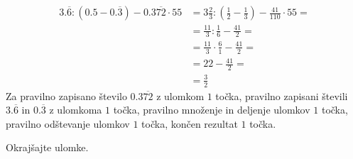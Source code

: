 \documentclass[addpoints,12pt]{exam}
\begin{document}
\begin{questions}
\begin{parts}
        \begin{solution}[4cm]
            \begin{align*}
                3.\overline{6}:(0.5-0.\overline{3})-0.3\overline{72}\cdot 55 &= 3\frac{2}{3}:(\frac{1}{2}-\frac{1}{3})-\frac{41}{110}\cdot 55= \\
                                                                            &= \frac{11}{3}:\frac{1}{6}-\frac{41}{2}= \\
                                                                            &= \frac{11}{3}\cdot \frac{6}{1}-\frac{41}{2}= \\
                                                                            &= 22-\frac{41}{2}= \\
                                                                            &= \frac{3}{2}
            \end{align*}
            Za pravilno zapisano število $0.3\overline{72}$ z ulomkom $1$ točka, pravilno zapisani števili $3.\overline{6}$ in $0.\overline{3}$ z ulomkoma $1$ točka, pravilno množenje in deljenje ulomkov $1$ točka, pravilno odštevanje ulomkov $1$ točka, končen rezultat $1$ točka.
        \end{solution}

    \end{parts}



    \newpage

    \question
    Okrajšajte ulomke.
\end{questions}
\end{document}
